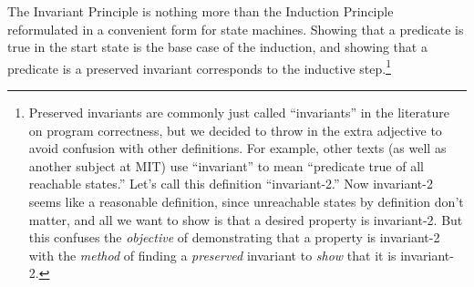 
The Invariant Principle is nothing more than the Induction Principle
reformulated in a convenient form for state machines.  Showing that a
predicate is true in the start state is the base case of the induction,
and showing that a predicate is a preserved invariant corresponds to the
inductive step.\footnote{Preserved invariants are commonly just called
  ``invariants'' in the literature on program correctness, but we decided
  to throw in the extra adjective to avoid confusion with other
  definitions.  For example, other texts (as well as another subject at
  MIT) use ``invariant'' to mean ``predicate true of all reachable
  states.''  Let's call this definition ``invariant-2.''  Now invariant-2
  seems like a reasonable definition, since unreachable states by
  definition don't matter, and all we want to show is that a desired
  property is invariant-2.  But this confuses the \emph{objective} of
  demonstrating that a property is invariant-2 with the \emph{method} of
  finding a \emph{preserved} invariant to \emph{show} that it is
  invariant-2.}

